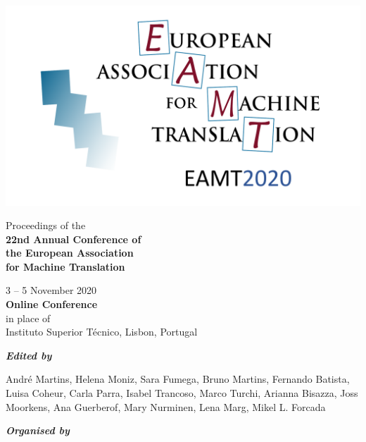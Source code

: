 \documentclass[a4paper,11pt,twoside]{book}
\newcommand{\newoddpage} {\clearpage
  \ifthenelse{\isodd{\value{page}}}{}
  {\thispagestyle{empty}\quad\newpage}}
\begin{document}
\pagestyle{fancy} 
\lhead{}
\rhead{}
\chead{}
\lfoot{} 
\rfoot{} 
\cfoot{\thepage}

\newoddpage
\thispagestyle{empty}
\enlargethispage{1cm}
\begin{center}
\phantom{x}
\vspace{-2cm}

\includegraphics[width=0.8\columnwidth]{logos/eamt2020-lisbon.pdf}

\vspace{1cm}

{\huge Proceedings of the}\\[2ex]
\textbf{\huge 22nd Annual Conference of \\[0.2ex]
  the European Association\\[1.0ex] for Machine Translation} 
  
\vspace{1.5cm}

{\LARGE 3 -- 5 November 2020\\{\bf Online Conference}\\[0.75ex]in place of\\[0.75ex]Instituto Superior Técnico, Lisbon, Portugal}
\vspace{3cm}

\textbf{\em Edited by}

\vspace{1em}
André Martins, 
Helena Moniz,
Sara Fumega,
Bruno Martins,
Fernando Batista,
Luisa Coheur,
Carla Parra,
Isabel Trancoso,
Marco Turchi,
Arianna Bisazza,
Joss Moorkens,
Ana Guerberof,
Mary Nurminen,
Lena Marg,
Mikel L. Forcada

\vfill

\textbf{\em Organised by}


\end{center}
\end{document}
